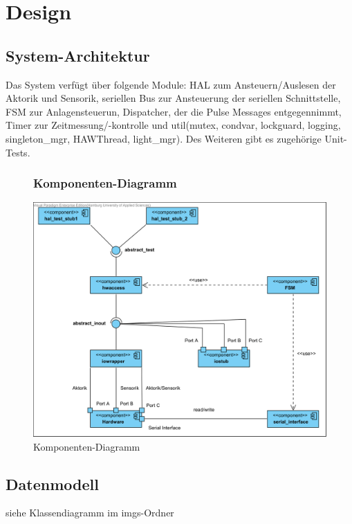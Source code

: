 \documentclass[oneside,a4paper,titlepage]{scrartcl}              %
\begin{document}
\newpage

\section{Design}

\subsection{System-Architektur}
Das System verfügt über folgende Module: HAL zum Ansteuern/Auslesen der Aktorik und Sensorik, seriellen Bus zur Ansteuerung der seriellen Schnittstelle, FSM zur Anlagensteuerun, Dispatcher, der die Pulse Messages entgegennimmt, Timer zur Zeitmessung/-kontrolle und util(mutex, condvar, lockguard, logging, singleton\_mgr, HAWThread, light\_mgr). Des Weiteren gibt es zugehörige Unit-Tests.

\begin{figure}[h]
  \subsubsection{Komponenten-Diagramm}
  \centering\includegraphics[angle=0,scale=0.93]{imgs/Sortieranlage-Komponenten.png}
  \caption{Komponenten-Diagramm}
\end{figure}

\subsection{Datenmodell}
siehe Klassendiagramm im imgs-Ordner
\end{document}
